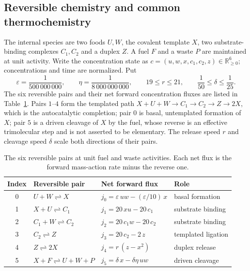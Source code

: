 \documentclass[11pt,a4paper]{article}
\theoremstyle{plain}
\theoremstyle{definition}
\theoremstyle{remark}
\newcommand{\R}{\mathbb R}
\newcommand{\eps}{\varepsilon}
\begin{document}
\subsection{Reversible chemistry and common thermochemistry}\label{sec:chemistry}
The internal species are two foods $U,W$, the covalent template $X$, two substrate-binding complexes $C_1,C_2$ and a duplex $Z$. A fuel $F$ and a waste $P$ are maintained at unit activity. Write the concentration state as $c=(u,w,x,c_1,c_2,z)\in\R_{\ge0}^6$; concentrations and time are normalized. Put
\begin{equation}\label{eq:parameters}
\eps=\frac1{500\,000\,000},\qquad \eta=\frac1{8\,000\,000\,000},\qquad
19\le r\le21,\qquad \frac1{50}\le\delta\le\frac1{25}.
\end{equation}
The six reversible pairs and their net forward concentration fluxes are listed in Table~\ref{tab:pairs}. Pairs $1$--$4$ form the templated path $X+U+W\to C_1\to C_2\to Z\to 2X$, which is the autocatalytic completion; pair $0$ is basal, untemplated formation of $X$; pair $5$ is a driven cleavage of $X$ by the fuel, whose reverse is an effective trimolecular step and is not asserted to be elementary. The release speed $r$ and cleavage speed $\delta$ scale both directions of their pairs.

\begin{table}[tb]
\centering\small
\begin{tabular}{clll}
\toprule
Index & Reversible pair & Net forward flux & Role\\
\midrule
0 & $U+W\rightleftharpoons X$ & $j_0=\eps\,uw-(\eps/10)\,x$ & basal formation\\
1 & $X+U\rightleftharpoons C_1$ & $j_1=20\,xu-20\,c_1$ & substrate binding\\
2 & $C_1+W\rightleftharpoons C_2$ & $j_2=20\,c_1w-20\,c_2$ & substrate binding\\
3 & $C_2\rightleftharpoons Z$ & $j_3=20\,c_2-2\,z$ & templated ligation\\
4 & $Z\rightleftharpoons 2X$ & $j_4=r\,(z-x^2)$ & duplex release\\
5 & $X+F\rightleftharpoons U+W+P$ & $j_5=\delta\,x-\delta\eta\,uw$ & driven cleavage\\
\bottomrule
\end{tabular}
\caption{The six reversible pairs at unit fuel and waste activities. Each net flux is the forward mass-action rate minus the reverse one.}
\label{tab:pairs}
\end{table}
\end{document}
